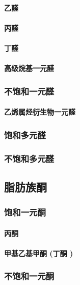 \documentclass[UTF8]{../03-Chemistry}
\begin{document}
            \paragraph{乙醛}
            \paragraph{丙醛}
            \paragraph{丁醛}
            \paragraph{高级烷基一元醛}

        \subsubsection{不饱和一元醛}
            \paragraph{乙烯属烃衍生物一元醛}
        \subsubsection{饱和多元醛}
        \subsubsection{不饱和多元醛}
    \subsection{脂肪族酮}
        \subsubsection{饱和一元酮}
            \paragraph{丙酮}
            \paragraph{甲基乙基甲酮 (丁酮 )}

        \subsubsection{不饱和一元酮}
\end{document}
